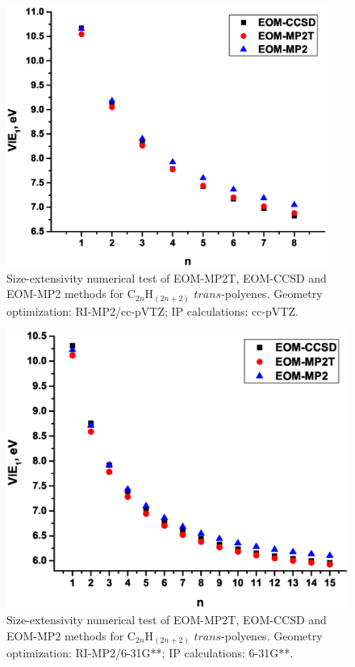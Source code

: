 \documentclass[12pt,nofootinbib]{revtex4}
\begin{document}
\begin{figure}[!tbh]
	\includegraphics[width=10.5cm]{./figures/size-ext_cc-pVTZ.eps}
	\caption{Size-extensivity numerical test of EOM-MP2T, EOM-CCSD and EOM-MP2 methods for C$_{2n}$H$_{(2n+2)}$ $trans$-polyenes. Geometry optimization: RI-MP2/cc-pVTZ; IP calculations: cc-pVTZ.
		\protect\label{fig:size-ext_cc-pVTZ}}
\end{figure}

\begin{figure}[!tbh]
	\includegraphics[width=14cm]{./figures/size-ext_6-31Gdp.eps}
	\caption{Size-extensivity numerical test of EOM-MP2T, EOM-CCSD and EOM-MP2 methods for C$_{2n}$H$_{(2n+2)}$ $trans$-polyenes. Geometry optimization: RI-MP2/6-31G**; IP calculations: 6-31G**.
		\protect\label{fig:size-ext_6-31Gdp}}
\end{figure}
\end{document}
